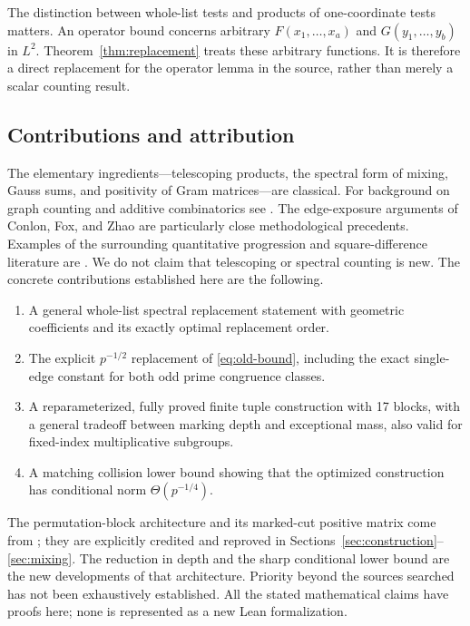 \documentclass[11pt,a4paper]{article}
\numberwithin{equation}{section}
\theoremstyle{definition}
\theoremstyle{remark}
\begin{document}
The distinction between whole-list tests and products of one-coordinate
tests matters. An operator bound concerns arbitrary $F(x_1,\ldots,x_a)$
and $G(y_1,\ldots,y_b)$ in $L^2$. Theorem~\ref{thm:replacement} treats
these arbitrary functions. It is therefore a direct replacement for the
operator lemma in the source, rather than merely a scalar counting result.

\subsection{Contributions and attribution}

The elementary ingredients---telescoping products, the spectral form of
mixing, Gauss sums, and positivity of Gram matrices---are classical.
For background on graph counting and additive combinatorics see
\cite{zhao}. The edge-exposure arguments of Conlon, Fox, and Zhao
\cite[Section 3]{cfz} are particularly close methodological precedents.
Examples of the surrounding quantitative progression and
square-difference literature are \cite{lss,bloommaynard}. We do not claim
that telescoping or spectral counting is new. The concrete contributions
established here are the following.

\begin{enumerate}
\item A general whole-list spectral replacement statement with geometric
      coefficients and its exactly optimal replacement order.
\item The explicit $p^{-1/2}$ replacement of \eqref{eq:old-bound}, including
      the exact single-edge constant for both odd prime congruence classes.
\item A reparameterized, fully proved finite tuple construction with 17
      blocks, with a general tradeoff between marking depth and exceptional
      mass, also valid for fixed-index multiplicative subgroups.
\item A matching collision lower bound showing that the optimized
      construction has conditional norm $\Theta(p^{-1/4})$.
\end{enumerate}

The permutation-block architecture and its marked-cut positive matrix
come from \cite[\texttt{build/sections/tuples.tex}]{square}; they are
explicitly credited and reproved in Sections~\ref{sec:construction}--\ref{sec:mixing}.
The reduction in depth and the sharp conditional lower bound are the new
developments of that architecture. Priority beyond the sources searched
has not been exhaustively established. All the stated mathematical
claims have proofs here; none is represented as a new Lean formalization.
\end{document}
